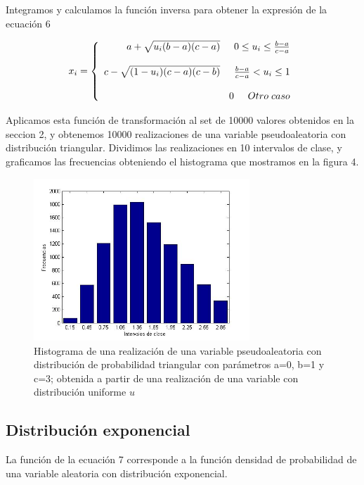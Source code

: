 \documentclass[10pt,journal,compsoc]{IEEEtran}
\begin{document}
Integramos y calculamos la funci\'on inversa para obtener la expresi\'on de la ecuaci\'on 6

\begin{equation}
 x_i = \left\{
  \begin{array}{rl}
	a+\sqrt{u_i(b-a)(c-a)} \hspace{0.5cm} 0 \le u_i \le \frac{b-a}{c-a}\\\\
	c-\sqrt{(1-u_i)(c-a)(c-b)} \hspace{0.5cm} \frac{b-a}{c-a} < u_i \le 1\\\\
	0 \hspace{0.5 cm} Otro \hspace{0.1cm} caso
  \end{array} \right.
\end{equation}

Aplicamos esta funci\'on de transformaci\'on al set de 10000 valores obtenidos en la seccion 2, y obtenemos
10000 realizaciones de una variable pseudoaleatoria con distribuci\'on triangular.  Dividimos las realizaciones
en 10 intervalos de clase, y graficamos las frecuencias obteniendo el histograma que mostramos en la figura 4.


\begin{figure}[t]
\label{fig:triangular}
\begin{center}
\centering
\includegraphics[width=3.2in]{triangular.jpg}
\caption{Histograma de una realizaci\'on de una variable pseudoaleatoria con distribuci\'on de probabilidad triangular con par\'ametros a=0, b=1 y c=3; obtenida a partir de una realizaci\'on de una variable con distribuci\'on uniforme $u$}
\end{center}
\end{figure}

\subsection{Distribuci\'on exponencial}
La funci\'on de la ecuaci\'on 7 corresponde a la funci\'on densidad de probabilidad de una variable aleatoria con distribuci\'on exponencial.
\end{document}
